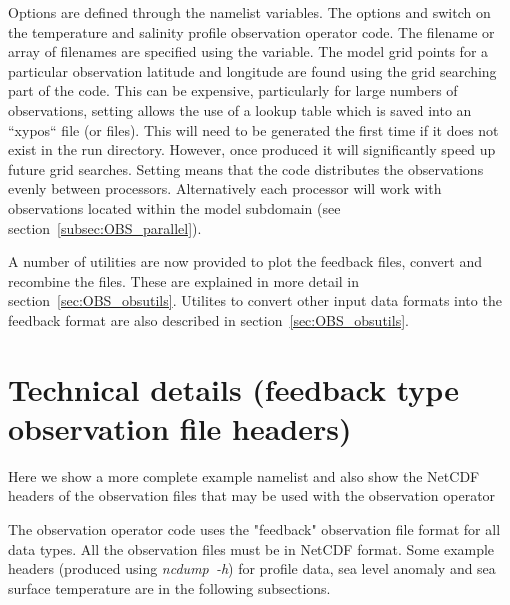 \documentclass[../tex_main/NEMO_manual]{subfiles}
\begin{document}

Options are defined through the   namelist variables.
The options  and  switch on the temperature and salinity
profile observation operator code. The filename or array of filenames are
specified using the  variable. The model grid points for a
particular  observation latitude and longitude are found using the grid
searching part of the code. This can be expensive, particularly for large
numbers of observations, setting  allows the use of
a lookup table which is saved into an ``xypos`` file (or files). This will need
to be generated the first time if it does not exist in the run directory.
However, once produced it will significantly speed up future grid searches.
Setting  means that the code distributes the observations
evenly between processors. Alternatively each processor will work with
observations located within the model subdomain (see section~\autoref{subsec:OBS_parallel}).

A number of utilities are now provided to plot the feedback files, convert and
recombine the files. These are explained in more detail in section~\autoref{sec:OBS_obsutils}.
Utilites to convert other input data formats into the feedback format are also 
described in section~\autoref{sec:OBS_obsutils}.

\section{Technical details (feedback type observation file headers)}
\label{sec:OBS_details}

Here we show a more complete example namelist   and also show the NetCDF headers
of the observation
files that may be used with the observation operator


The observation operator code uses the "feedback" observation file format for
all data types. All the
observation files must be in NetCDF format. Some example headers (produced using
\mbox{\textit{ncdump~-h}}) for profile
data, sea level anomaly and sea surface temperature are in the following
subsections.
\end{document}
